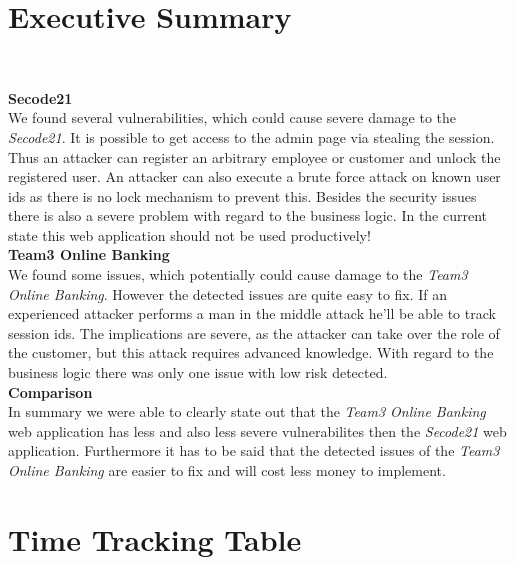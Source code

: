 \documentclass[headsepline,footsepline,footinclude=false,oneside,fontsize=11pt,paper=a4,listof=totoc,bibliography=totoc]{scrbook} %
\begin{document}


\frontmatter{}


{
	\chapter{Executive Summary}\

   \textbf{Secode21}\\

	We found several vulnerabilities, which could cause severe damage to the \textit{Secode21}. It is possible to get access to the admin page via stealing the session. Thus an attacker can register an arbitrary employee or customer and unlock the registered user. An	attacker can also execute a brute force attack on known user ids as there is no lock mechanism to prevent this. Besides the security issues there is also a severe problem with regard to the business logic. In the current state this web application should not be used productively!	\\


	\textbf{Team3 Online Banking}\\

	We found some issues, which potentially could cause damage to the \textit{Team3 Online Banking}. However the detected issues are quite easy to fix. If an experienced attacker performs a man in the middle attack he'll be able to track session ids. The implications are severe, as the	attacker can take over the role of the customer, but this attack requires advanced knowledge. With regard to the business logic there was only one issue with low risk detected. \\

	\textbf{Comparison}\\

	In summary we were able to clearly state out that the \textit{Team3 Online Banking} web application has less and also less severe vulnerabilites then the \textit{Secode21} web application. Furthermore it has to be said that the detected issues of the \textit{Team3 Online Banking} are easier to fix and will cost less money to implement.
}

\pagebreak
%
%
%
%
\tableofcontents{}

\mainmatter{}

\chapter{Time Tracking Table}
%
\end{document}
